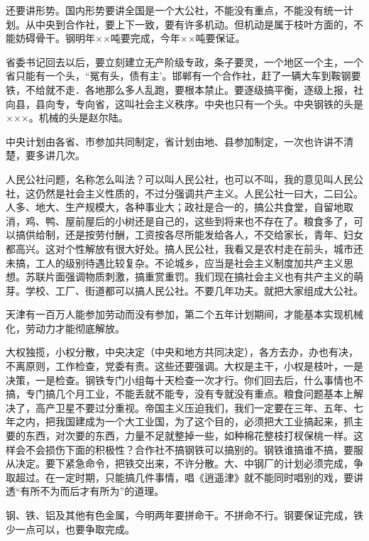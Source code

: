 还要讲形势。国内形势要讲全国是一个大公社，不能没有重点，不能没有统一计划。从中央到合作社，要上下一致，要有许多机动。但机动是属于枝叶方面的，不能妨碍骨干。钢明年××吨要完成，今年××吨要保证。

省委书记回去以后，要立刻建立无产阶级专政，条子要灵，一个地区一个主，一个省只能有一个头，“冤有头，债有主’。邯郸有一个合作社，赶了一辆大车到鞍钢要铁，不给就不走．各地那么多人乱跑，要根本禁止。要逐级搞平衡，逐级上报，社向县，县向专，专向省，这叫社会主义秩序。中央也只有一个头。中央钢铁的头是×××。机械的头是赵尔陆。

中央计划由各省、市参加共同制定，省计划由地、县参加制定，一次也许讲不清楚，要多讲几次。

人民公社问题，名称怎么叫法？可以叫人民公社，也可以不叫，我的意见叫人民公社，这仍然是社会主义性质的，不过分强调共产主义。人民公社一曰大，二曰公。人多、地大、生产规模大，各种事业大；政社是合一的，搞公共食堂，自留地取消，鸡、鸭、屋前屋后的小树还是自己的，这些到将来也不存在了。粮食多了，可以搞供给制，还是按劳付酬，工资按各尽所能发给各人，不交给家长，青年、妇女都高兴。这对个性解放有很大好处。搞人民公社，我看又是农村走在前头，城市还未搞，工人的级别待遇比较复杂。不论城乡，应当是社会主义制度加共产主义思想。苏联片面强调物质刺激，搞重赏重罚。我们现在搞社会主义也有共产主义的萌芽。学校、工厂、街道都可以搞人民公社。不要几年功夫。就把大家组成大公社。

天津有一百万人能参加劳动而没有参加，第二个五年计划期间，才能基本实现机械化，劳动力才能彻底解放。

大权独揽，小权分散，中央决定（中央和地方共同决定），各方去办，办也有决，不离原则，工作检查，党委有责。这些还要强调。大权是主干，小权是枝叶，一是决策，一是检查。钢铁专门小组每十天检查一次才行。你们回去后，什么事情也不搞，专门搞几个月工业，不能丢就不能专，没有专就没有重点。粮食问题基本上解决了，高产卫星不要过分重视。帝国主义压迫我们，我们一定要在三年、五年、七年之内，把我国建成为一个大工业国，为了这个目的，必须把大工业搞起来，抓主要的东西，对次要的东西，力量不足就整掉一些，如种棉花整枝打杈保桃一样。这样会不会损伤下面的积极性？合作社不搞钢铁可以搞别的。钢铁谁搞谁不搞，要服从决定。要下紧急命令，把铁交出来，不许分散。大、中钢厂的计划必须完成，争取超过。在一定时期，只能搞几件事情，唱《逍遥津》就不能同时唱别的戏，要讲透“有所不为而后才有所为”的道理。

钢、铁、铝及其他有色金属，今明两年要拼命干。不拼命不行。钢要保证完成，铁少一点可以，也要争取完成。

